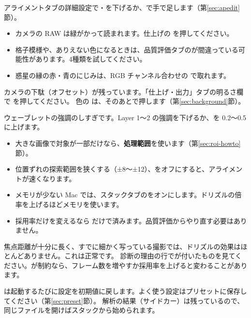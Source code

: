 アライメントタブの詳細設定で・を下げるか、で手で足します（第\ref{sec:apedit}節）。

\begin{itemize}[itemsep=1pt]
  \item カメラの RAW は緑がかって読まれます。仕上げの  を押してください。
  \item 格子模様や、ありえない色になるときは、品質評価タブのが間違っている可能性があります。4種類を試してください。
  \item 惑星の縁の赤・青のにじみは、RGB チャンネル合わせの  で取れます。
\end{itemize}

カメラの下駄（オフセット）が残っています。「仕上げ・出力」タブの明るさ欄で  を押してください。
色の  は、そのあとで押します（第\ref{sec:background}節）。

ウェーブレットの強調のしすぎです。Layer 1〜2 の強調を下げるか、を 0.2〜0.5 に上げます。

\begin{itemize}[itemsep=1pt]
  \item 大きな画像で対象が一部だけなら、\textbf{処理範囲}を使います（第\ref{sec:roi-howto}節）。
  \item 位置ずれの探索範囲を狭くする（±8〜±12）、をオフにすると、アライメントが速くなります。
  \item メモリが少ない Mac では、スタックタブのをオンにします。ドリズルの倍率を上げるほどメモリを使います。
  \item 採用率だけを変えるなら  だけで済みます。品質評価からやり直す必要はありません。
\end{itemize}

焦点距離が十分に長く、すでに細かく写っている撮影では、ドリズルの効果はほとんどありません。これは正常です。
診断の理由の行でが付いたものを見てください。が制約なら、フレーム数を増やすか採用率を上げると変わることがあります。

\LS は起動するたびに設定を初期値に戻します。よく使う設定はプリセットに保存してください（第\ref{sec:preset}節）。
解析の結果（サイドカー）は残っているので、同じファイルを開けばスタックから始められます。

